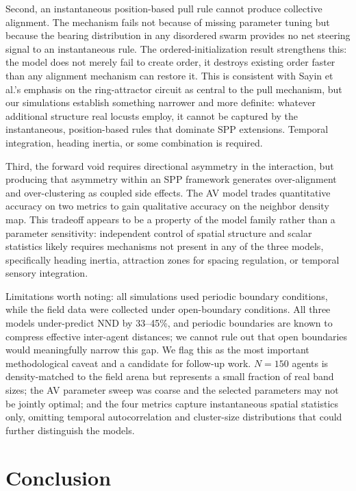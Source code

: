 \documentclass[11pt]{article}
\begin{document}
Second, an instantaneous position-based pull rule cannot produce collective alignment. The mechanism fails not because of missing parameter tuning but because the bearing distribution in any disordered swarm provides no net steering signal to an instantaneous rule. The ordered-initialization result strengthens this: the model does not merely fail to create order, it destroys existing order faster than any alignment mechanism can restore it. This is consistent with Sayin et al.'s emphasis on the ring-attractor circuit as central to the pull mechanism, but our simulations establish something narrower and more definite: whatever additional structure real locusts employ, it cannot be captured by the instantaneous, position-based rules that dominate SPP extensions. Temporal integration, heading inertia, or some combination is required.

Third, the forward void requires directional asymmetry in the interaction, but producing that asymmetry within an SPP framework generates over-alignment and over-clustering as coupled side effects. The AV model trades quantitative accuracy on two metrics to gain qualitative accuracy on the neighbor density map. This tradeoff appears to be a property of the model family rather than a parameter sensitivity: independent control of spatial structure and scalar statistics likely requires mechanisms not present in any of the three models, specifically heading inertia, attraction zones for spacing regulation, or temporal sensory integration.

Limitations worth noting: all simulations used periodic boundary conditions, while the field data were collected under open-boundary conditions. All three models under-predict NND by 33--45\%, and periodic boundaries are known to compress effective inter-agent distances; we cannot rule out that open boundaries would meaningfully narrow this gap. We flag this as the most important methodological caveat and a candidate for follow-up work. $N = 150$ agents is density-matched to the field arena but represents a small fraction of real band sizes; the AV parameter sweep was coarse and the selected parameters may not be jointly optimal; and the four metrics capture instantaneous spatial statistics only, omitting temporal autocorrelation and cluster-size distributions that could further distinguish the models.

\section{Conclusion}
\end{document}
